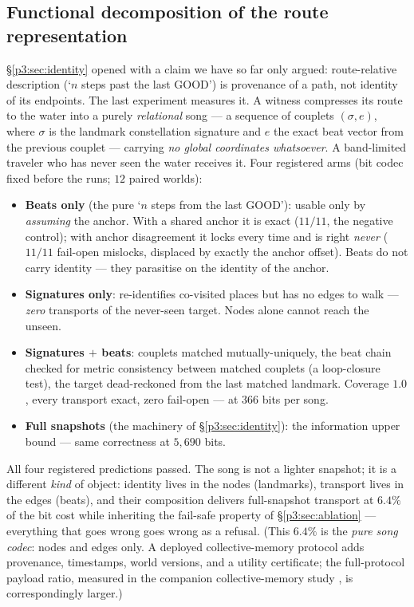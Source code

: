 \documentclass{article}
\begin{document}
\subsection{Functional decomposition of the route representation}
\label{p3:sec:anatomy}

\S\ref{p3:sec:identity} opened with a claim we have so far only argued:
route-relative description (`$n$ steps past the last GOOD') is
provenance of a path, not identity of its endpoints. The last
experiment measures it. A witness compresses its route to the water
into a purely \emph{relational} song --- a sequence of couplets
$(\sigma, e)$, where $\sigma$ is the landmark constellation signature
and $e$ the exact beat vector from the previous couplet --- carrying
\emph{no global coordinates whatsoever}. A band-limited traveler who
has never seen the water receives it. Four registered arms (bit codec
fixed before the runs; $12$ paired worlds):

\begin{itemize}[leftmargin=16pt,itemsep=2pt,topsep=2pt]
\item \textbf{Beats only} (the pure `$n$ steps from the last GOOD'):
  usable only by \emph{assuming} the anchor. With a shared anchor it
  is exact ($11/11$, the negative control); with anchor disagreement
  it locks every time and is right \emph{never} ($11/11$ fail-open
  mislocks, displaced by exactly the anchor offset). Beats do not
  carry identity --- they parasitise on the identity of the anchor.
\item \textbf{Signatures only}: re-identifies co-visited places but
  has no edges to walk --- \emph{zero} transports of the never-seen
  target. Nodes alone cannot reach the unseen.
\item \textbf{Signatures $+$ beats}: couplets matched mutually-uniquely,
  the beat chain checked for metric consistency between matched
  couplets (a loop-closure test), the target dead-reckoned from the
  last matched landmark. Coverage $1.0$, every transport exact, zero
  fail-open --- at $366$ bits per song.
\item \textbf{Full snapshots} (the machinery of
  \S\ref{p3:sec:identity}): the information upper bound --- same
  correctness at $5{,}690$ bits.
\end{itemize}

All four registered predictions passed. The song is not a lighter
snapshot; it is a different \emph{kind} of object: identity lives in
the nodes (landmarks), transport lives in the edges (beats), and
their composition delivers full-snapshot transport at $6.4\%$ of the
bit cost while inheriting the fail-safe property of
\S\ref{p3:sec:ablation} --- everything that goes wrong goes wrong as a
refusal. (This $6.4\%$ is the \emph{pure song codec}: nodes and
edges only. A deployed collective-memory protocol adds provenance,
timestamps, world versions, and a utility certificate; the
full-protocol payload ratio, measured in the companion collective-memory study \citep{songlines3}, is correspondingly larger.)
\end{document}
